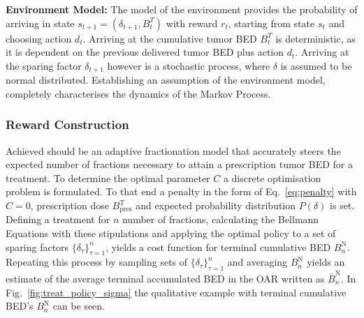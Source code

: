 \documentclass[\relativeRoot/ada.tex]{subfiles}
\begin{document}
\textbf{Environment Model:} The model of the environment provides the probability of    arriving in state $s_{t+1} = (\delta_{t+1}, B^T_{t})$ with reward $r_t$, starting from state $s_t$ and choosing action $d_t$. Arriving at the cumulative tumor BED $B^T_{t}$ is deterministic, as it is dependent on the previous delivered tumor BED plus action $d_t$. Arriving at the sparing factor $\delta_{t+1}$ however is a stochastic process, where $\delta$ is assumed to be normal distributed. Establishing an assumption of the environment model, completely characterises the dynamics of the Markov Process.

\subsubsection{Reward Construction}
Achieved should be an adaptive fractionation model that accurately steers the expected number of fractions necessary to attain a prescription tumor BED for a treatment. To determine the optimal parameter $C$ a discrete optimisation problem is formulated. To that end a penalty in the form of Eq.~\eqref{eq:penalty} with $C=0$, prescription dose $B_{\text{pres}}^{\text{T}}$ and expected probability distribution $P(\delta)$ is set. Defining a treatment for $n$ number of fractions, calculating the Bellmann Equations with these stipulations and applying the optimal policy to a set of sparing factors $\{\delta_\tau\}_{\tau=1}^{n}$, yields a cost function for terminal cumulative BED $B^{\text{N}}_n$. Repeating this process by sampling sets of $\{\delta_\tau\}_{\tau=1}^{n}$ and averaging $B^{\text{N}}_n$ yields an estimate of the average terminal accumulated BED in the OAR written as $\bar{B}^{\text{N}}_n$. In Fig.~\ref{fig:treat_policy_sigma} the qualitative example with terminal cumulative BED's $B^{\text{N}}_n$ can be seen.
\end{document}
